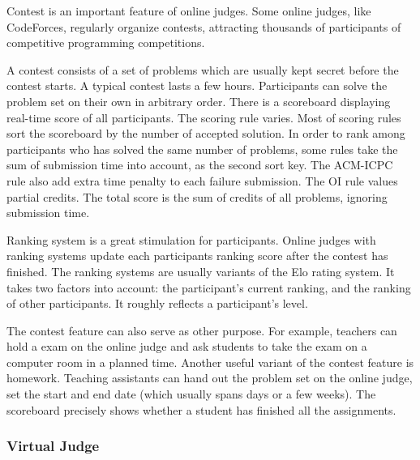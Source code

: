             Contest is an important feature of online judges.
            Some online judges, like CodeForces, regularly organize contests,
            attracting thousands of participants of competitive programming competitions.

            A contest consists of a set of problems
            which are usually kept secret before the contest starts.
            A typical contest lasts a few hours.
            Participants can solve the problem set on their own in arbitrary order.
            There is a scoreboard displaying real-time score of all participants.
            The scoring rule varies.
            Most of scoring rules sort the scoreboard by the number of accepted solution.
            In order to rank among participants who has solved the same number of problems,
            some rules take the sum of submission time into account, as the second sort key.
            The ACM-ICPC rule also add extra time penalty to each failure submission.
            The OI rule values partial credits.
            The total score is the sum of credits of all problems, ignoring submission time.

            Ranking system is a great stimulation for participants.
            Online judges with ranking systems update each participants ranking score
            after the contest has finished.
            The ranking systems are usually variants of the Elo rating system. 
            It takes two factors into account:
            the participant's current ranking, and the ranking of other participants.
            It roughly reflects a participant's level.

            The contest feature can also serve as other purpose.
            For example, teachers can hold a exam on the online judge
            and ask students to take the exam on a computer room in a planned time.
            Another useful variant of the contest feature is homework.
            Teaching assistants can hand out the problem set on the online judge,
            set the start and end date (which usually spans days or a few weeks).
            The scoreboard precisely shows whether a student has finished all the assignments.

        \subsubsection{Virtual Judge} 


